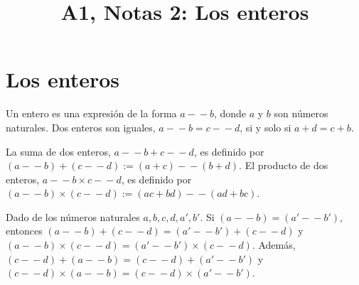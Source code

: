 

\title{A1, Notas 2: Los enteros}

\maketitle


\section{Los enteros}

\begin{definition}
  Un entero es una expresión de la forma $a\!-\!\!\!-b$, donde $a$ y $b$ son números naturales. Dos enteros son iguales, $a\!-\!\!\!-b = c\!-\!\!\!-d$, si y solo si $a + d = c + b$.
\end{definition}

\begin{definition}
  La suma de dos enteros, $a\!-\!\!\!-b + c\!-\!\!\!-d$, es definido por $(a\!-\!\!\!-b) + (c\!-\!\!\!-d) := (a + c)\!-\!\!\!-(b + d)$. El producto de dos enteros, $a\!-\!\!\!-b \times c\!-\!\!\!-d$, es definido por $(a\!-\!\!\!-b) \times (c\!-\!\!\!-d) := (ac + bd)\!-\!\!\!-(ad + bc)$.
\end{definition}


\begin{lemma}
  Dado de los números naturales $a ,b, c ,d, a', b'$. Si $(a\!-\!\!\!-b) = (a'\!-\!\!\!-b')$, entonces $(a\!-\!\!\!-b) + (c\!-\!\!\!-d) = (a'\!-\!\!\!-b') + (c\!-\!\!\!-d)$ y $(a\!-\!\!\!-b) \times (c\!-\!\!\!-d) = (a'\!-\!\!\!-b') \times (c\!-\!\!\!-d)$. Además, $(c\!-\!\!\!-d) + (a\!-\!\!\!-b) = (c\!-\!\!\!-d) + (a'\!-\!\!\!-b')$ y $(c\!-\!\!\!-d) \times (a\!-\!\!\!-b) = (c\!-\!\!\!-d) \times (a'\!-\!\!\!-b')$.
\end{lemma}



